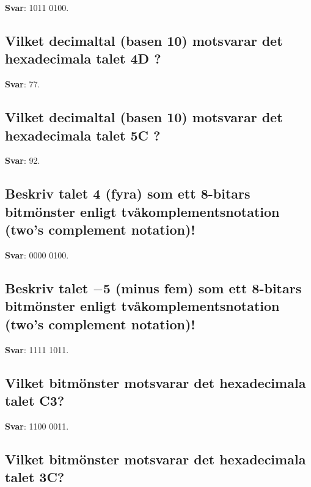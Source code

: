 \documentclass[a4paper,11pt,oneside]{article}
\begin{document}
\begin{sloppypar}
\label{q:383:sa:sv:True}

\textbf{Svar}: 1011 0100.



\subsection{Vilket decimaltal (basen 10) motsvarar det hexadecimala talet 4D ?}

\label{q:384:sa:sv:True}

\textbf{Svar}: 77.



\subsection{Vilket decimaltal (basen 10) motsvarar det hexadecimala talet 5C ?}

\label{q:385:sa:sv:True}

\textbf{Svar}: 92.



\subsection{Beskriv talet 4 (fyra) som ett 8-bitars bitm\"onster enligt tv\r{a}komplementsnotation (two{\textquoteright}s complement notation)!}

\label{q:386:sa:sv:True}

\textbf{Svar}: 0000 0100.



\subsection{Beskriv talet \ensuremath{-}5 (minus fem) som ett 8-bitars bitm\"onster enligt tv\r{a}komplementsnotation (two{\textquoteright}s complement notation)!}

\label{q:387:sa:sv:True}

\textbf{Svar}: 1111 1011.



\subsection{Vilket bitm\"onster motsvarar det hexadecimala talet C3?}

\label{q:388:sa:sv:True}

\textbf{Svar}: 1100 0011.



\subsection{Vilket bitm\"onster motsvarar det hexadecimala talet 3C?}


\end{sloppypar}
\end{document}
